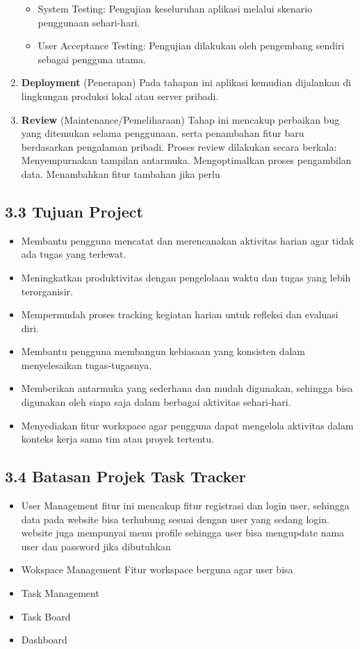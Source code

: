 \begin{enumerate}
\begin{itemize}
        \item System Testing: Pengujian keseluruhan aplikasi melalui skenario penggunaan sehari-hari.
        \item User Acceptance Testing: Pengujian dilakukan oleh pengembang sendiri sebagai pengguna utama.
    \end{itemize}
    \item \textbf{Deployment} (Penerapan)
    Pada tahapan ini aplikasi kemudian dijalankan di lingkungan produksi lokal atau server pribadi.
    \item \textbf{Review} (Maintenance/Pemeliharaan)
    Tahap ini mencakup perbaikan bug yang ditemukan selama penggunaan, serta penambahan fitur baru berdasarkan pengalaman pribadi.
    Proses review dilakukan secara berkala: Menyempurnakan tampilan antarmuka.
    Mengoptimalkan proses pengambilan data. 
    Menambahkan fitur tambahan jika perlu
\end{enumerate}


\subsection*{3.3 Tujuan Project}
\begin{itemize}
    \item Membantu pengguna mencatat dan merencanakan aktivitas harian agar tidak ada tugas yang terlewat. 
    \item Meningkatkan produktivitas dengan pengelolaan waktu dan tugas yang lebih terorganisir.
    \item Mempermudah proses tracking kegiatan harian untuk refleksi dan evaluasi diri.
    \item Membantu pengguna membangun kebiasaan yang konsisten dalam menyelesaikan tugas-tugasnya. 
    \item Memberikan antarmuka yang sederhana dan mudah digunakan, sehingga bisa digunakan oleh siapa saja dalam berbagai aktivitas sehari-hari. 
    \item Menyediakan fitur workspace agar pengguna dapat mengelola aktivitas dalam konteks kerja sama tim atau proyek tertentu.
\end{itemize}

\subsection*{3.4 Batasan Projek Task Tracker}
\begin{itemize}
    \item User Management
    fitur ini mencakup fitur registrasi dan login user, sehingga data pada website bisa terhubung sesuai dengan user yang sedang login.
    website juga mempunyai menu profile sehingga user bisa mengupdate nama user dan password jika dibutuhkan
    \item Wokspace Management
    Fitur workspace berguna agar user bisa 
    \item Task Management
    \item Task Board
    \item Dashboard  
\end{itemize}

